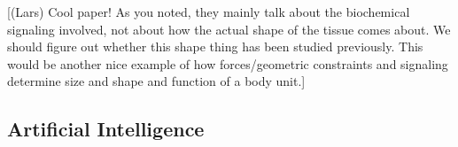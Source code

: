 \documentclass[fleqn,10pt]{wlscirep}
\begin{document}




[(Lars) Cool paper! As you noted, they mainly talk about the biochemical signaling involved, not about how the actual shape of the tissue comes about. We should figure out whether this shape thing has been studied previously. This would be another nice example of how forces/geometric constraints and signaling determine size and shape and function of a body unit.]





\subsection*{Artificial Intelligence}

\end{document}
